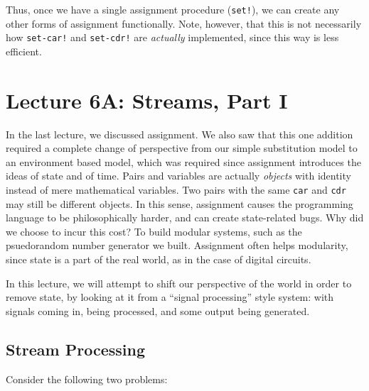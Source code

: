 \documentclass[9pt]{report}
\begin{document}
Thus, once we have a single assignment procedure (\texttt{set!}), we can
create any other forms of assignment functionally. Note, however,
that this is not necessarily how \texttt{set-car!} and \texttt{set-cdr!} are
\emph{actually} implemented, since this way is less efficient.

\chapter{Lecture 6A: Streams, Part I}
\label{sec:org59f328b}

In the last lecture, we discussed assignment. We also saw that this
one addition required a complete change of perspective from our
simple substitution model to an environment based model, which was
required since assignment introduces the ideas of state and of time.
Pairs and variables are actually \emph{objects} with identity instead of
mere mathematical variables. Two pairs with the same \texttt{car} and \texttt{cdr}
may still be different objects. In this sense, assignment causes the
programming language to be philosophically harder, and can create
state-related bugs. Why did we choose to incur this cost? To build
modular systems, such as the psuedorandom number generator we built.
Assignment often helps modularity, since state is a part of the real
world, as in the case of digital circuits.

In this lecture, we will attempt to shift our perspective of the
world in order to remove state, by looking at it from a ``signal
processing'' style system: with signals coming in, being processed,
and some output being generated.

\section{Stream Processing}
\label{sec:org934a442}

Consider the following two problems:
\end{document}
